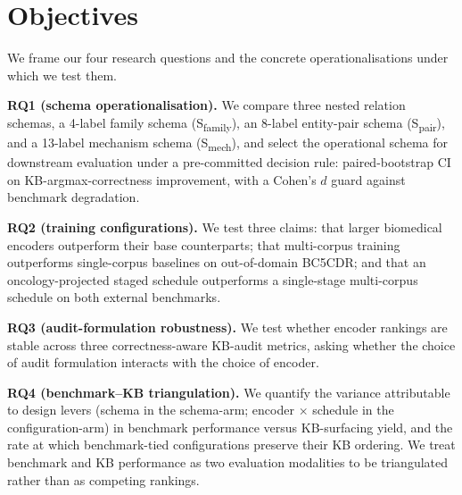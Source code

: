 %
%
\section{Objectives}
\label{sec:objectives}

We frame our four research questions and the concrete operationalisations
under which we test them.

\textbf{RQ1 (schema operationalisation).}
We compare three nested relation schemas, a 4-label family schema
(S\textsubscript{family}), an 8-label entity-pair schema
(S\textsubscript{pair}), and a 13-label mechanism schema
(S\textsubscript{mech}), and select the operational schema for
downstream evaluation under a pre-committed decision rule:
paired-bootstrap CI on KB-argmax-correctness improvement, with a
Cohen's \(d\) guard against benchmark degradation.

\textbf{RQ2 (training configurations).}
We test three claims: that larger biomedical encoders outperform
their base counterparts; that multi-corpus training outperforms
single-corpus baselines on out-of-domain BC5CDR; and that an
oncology-projected staged schedule outperforms a single-stage
multi-corpus schedule on both external benchmarks.

\textbf{RQ3 (audit-formulation robustness).}
We test whether encoder rankings are stable across three
correctness-aware KB-audit metrics, asking whether the choice of
audit formulation interacts with the choice of encoder.

\textbf{RQ4 (benchmark--KB triangulation).}
We quantify the variance attributable to design levers (schema in
the schema-arm; encoder \(\times\) schedule in the configuration-arm)
in benchmark performance versus KB-surfacing yield, and the rate at
which benchmark-tied configurations preserve their KB ordering. We
treat benchmark and KB performance as two evaluation modalities to
be triangulated rather than as competing rankings.